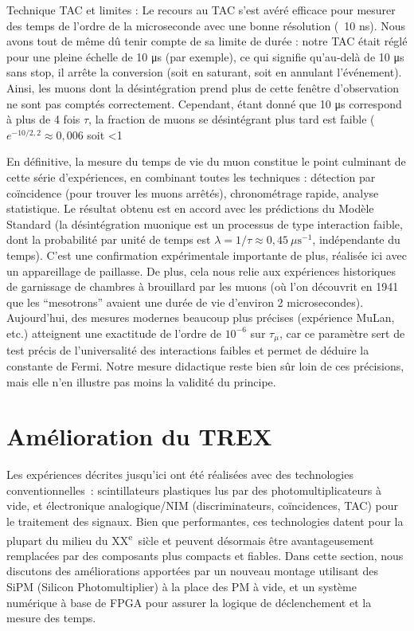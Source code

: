 \documentclass[a4paper,12pt,twoside]{article}
\begin{document}
Technique TAC et limites : Le recours au TAC s’est avéré efficace pour mesurer des temps de l’ordre de la microseconde avec une bonne résolution (~10 ns). Nous avons tout de même dû tenir compte de sa limite de durée : notre TAC était réglé pour une pleine échelle de 10 μs (par exemple), ce qui signifie qu’au-delà de 10 μs sans stop, il arrête la conversion (soit en saturant, soit en annulant l’événement). Ainsi, les muons dont la désintégration prend plus de cette fenêtre d’observation ne sont pas comptés correctement. Cependant, étant donné que 10 μs correspond à plus de 4 fois $\tau$, la fraction de muons se désintégrant plus tard est faible ($e^{-10/2,2} \approx 0,006$ soit <1%

En définitive, la mesure du temps de vie du muon constitue le point culminant de cette série d’expériences, en combinant toutes les techniques : détection par coïncidence (pour trouver les muons arrêtés), chronométrage rapide, analyse statistique. Le résultat obtenu est en accord avec les prédictions du Modèle Standard (la désintégration muonique est un processus de type interaction faible, dont la probabilité par unité de temps est $\lambda = 1/\tau \approx 0,45~\mu\text{s}^{-1}$, indépendante du temps). C’est une confirmation expérimentale importante de plus, réalisée ici avec un appareillage de paillasse. De plus, cela nous relie aux expériences historiques de garnissage de chambres à brouillard par les muons (où l’on découvrit en 1941 que les “mesotrons” avaient une durée de vie d’environ 2 microsecondes). Aujourd’hui, des mesures modernes beaucoup plus précises (expérience MuLan, etc.) atteignent une exactitude de l’ordre de $10^{-6}$ sur $\tau_\mu$, car ce paramètre sert de test précis de l’universalité des interactions faibles et permet de déduire la constante de Fermi. Notre mesure didactique reste bien sûr loin de ces précisions, mais elle n’en illustre pas moins la validité du principe.

\section{Amélioration du TREX}
Les exp\'eriences d\'ecrites jusqu'ici ont \'et\'e r\'ealis\'ees avec des technologies conventionnelles~: scintillateurs plastiques lus par des photomultiplicateurs \`a vide, et \'electronique analogique/NIM (discriminateurs, co\"incidences, TAC) pour le traitement des signaux. Bien que performantes, ces technologies datent pour la plupart du milieu du XX\textsuperscript{e}~si\`cle et peuvent d\'esormais \^etre avantageusement remplac\'ees par des composants plus compacts et fiables. Dans cette section, nous discutons des am\'eliorations apport\'ees par un nouveau montage utilisant des SiPM (Silicon Photomultiplier) \`a la place des PM \`a vide, et un syst\`eme num\'erique \`a base de FPGA pour assurer la logique de d\'eclenchement et la mesure des temps.
\end{document}
